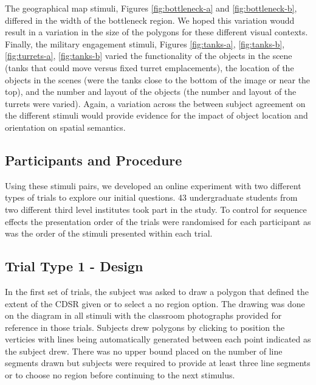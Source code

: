 \documentclass[11pt,letterpaper]{article}
\begin{document}
The geographical map stimuli, Figures \ref{fig:bottleneck-a} and \ref{fig:bottleneck-b}, differed in the width of the bottleneck region. We hoped this variation woudd result in a variation in the size of the polygons for these different visual contexts. Finally, the military engagement stimuli, Figures \ref{fig:tanks-a}, \ref{fig:tanks-b}, \ref{fig:turrets-a}, \ref{fig:tanks-b} varied the functionality of the objects in the scene (tanks that could move versus fixed turret emplacements), the location of the objects in the scenes (were the tanks close to the bottom of the image or near the top), and the number and layout of the objects (the number and layout of the turrets were varied). Again, a variation across the between subject agreement on the different stimuli would provide evidence for the impact of object location and orientation on spatial semantics.

\subsection{Participants and Procedure}
Using these stimuli pairs, we developed an online experiment with two different types of trials to explore our initial questions. 43 undergraduate students from two different third level institutes took part in the study. To control for sequence effects the presentation order of the trials were randomised for each participant as was the order of the stimuli presented within each trial.   

\subsection{Trial Type 1 - Design}
In the first set of trials, the subject was asked to draw a polygon that defined the extent of the CDSR given or to select a no region option.  The drawing was done on the diagram in all stimuli with the classroom photographs provided for reference in those trials.  Subjects drew polygons by clicking to position the verticies with lines being automatically generated between each point indicated as the subject drew.  There was no upper bound placed on the number of line segments drawn but subjects were required to provide at least three line segments or to choose no region before continuing to the next stimulus.
\end{document}
